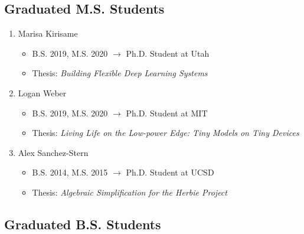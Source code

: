 \documentclass[10pt]{article}
\begin{document}
\subsection*{Graduated M.S. Students}

\begin{enumerate}[resume]
  \item Marisa Kirisame
    \begin{itemize}
      \item B.S. 2019, M.S. 2020 $\rightarrow$ Ph.D. Student at Utah
      \item Thesis: \textit{Building Flexible Deep Learning Systems}
    \end{itemize}

  \item Logan Weber
    \begin{itemize}
      \item B.S. 2019, M.S. 2020 $\rightarrow$ Ph.D. Student at MIT
      \item Thesis: \textit{Living Life on the Low-power Edge: Tiny Models on Tiny Devices}
    \end{itemize}

  \item Alex Sanchez-Stern
    \begin{itemize}
      \item B.S. 2014, M.S. 2015 $\rightarrow$ Ph.D. Student at UCSD
      \item Thesis: \textit{Algebraic Simplification for the Herbie Project}
    \end{itemize}
\end{enumerate}

\subsection*{Graduated B.S. Students}
\end{document}
